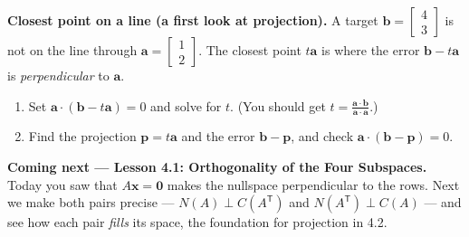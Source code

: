 \documentclass[10pt]{article}
\newcommand{\avec}{\mathbf{a}}
\newcommand{\bb}{\mathbf{b}}
\newcommand{\pp}{\mathbf{p}}
\newcommand{\zero}{\mathbf{0}}
\begin{document}
\begin{extensionbox}
\textbf{Closest point on a line (a first look at projection).} A target
$\bb=\begin{bmatrix} 4 \\ 3 \end{bmatrix}$ is not on the line through
$\avec=\begin{bmatrix} 1 \\ 2 \end{bmatrix}$. The closest point $t\avec$ is where the error
$\bb-t\avec$ is \emph{perpendicular} to $\avec$.
\begin{enumerate}[label=(\alph*), leftmargin=1.8em, itemsep=5pt]
  \item Set $\avec\cdot(\bb-t\avec)=0$ and solve for $t$. (You should get $t=\frac{\avec\cdot\bb}{\avec\cdot\avec}$.)
  \item Find the projection $\pp=t\avec$ and the error $\bb-\pp$, and check $\avec\cdot(\bb-\pp)=0$.
\end{enumerate}
\end{extensionbox}

\begin{spiralbox}
\textbf{Coming next --- Lesson 4.1: Orthogonality of the Four Subspaces.} Today you saw that
$A\mathbf x=\zero$ makes the nullspace perpendicular to the rows. Next we make both pairs precise
--- $N(A)\perp C(A^{\mathsf T})$ and $N(A^{\mathsf T})\perp C(A)$ --- and see how each pair
\emph{fills} its space, the foundation for projection in 4.2.
\end{spiralbox}
\end{document}
